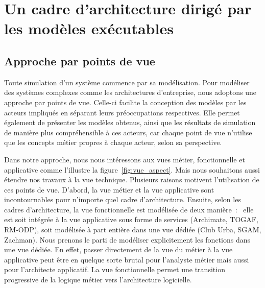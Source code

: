 \section{Un cadre d'architecture dirigé par les modèles exécutables}

\subsection{Approche par points de vue}

Toute simulation d'un système commence par sa modélisation. Pour modéliser des 
systèmes complexes comme les architectures d'entreprise, nous adoptons une 
approche par points de vue. Celle-ci facilite la conception des modèles par les 
acteurs impliqués en séparant leurs préoccupations respectives. Elle permet 
également de présenter les modèles obtenus, ainsi que les résultats de 
simulation de manière plus compréhensible à ces acteurs, car chaque point de vue 
n'utilise que les concepts métier propres à chaque acteur, selon sa perspective. 

Dans notre approche, nous nous intéressons aux vues métier, fonctionnelle et 
applicative comme l'illustre la figure~\ref{fig:vue_aspect}. Mais nous 
souhaitons aussi étendre nos travaux à la vue technique. 
Plusieurs raisons motivent l'utilisation de ces points de vue. D'abord, la vue 
métier et la vue applicative sont incontournables pour n'importe quel cadre 
d'architecture. Ensuite, selon les cadres d'architecture, la vue fonctionnelle 
est modélisée de deux manière~:~ elle est soit intégrée à la vue applicative 
sous forme de services (Archimate, TOGAF, RM-ODP), soit modélisée à part entière 
dans une vue dédiée (Club Urba, SGAM, Zachman). Nous prenons le parti de 
modéliser explicitement les fonctions dans une vue dédiée. En effet, passer 
directement de la vue du métier à la vue applicative peut être en quelque sorte 
brutal pour l'analyste métier mais aussi pour l'architecte applicatif. La vue 
fonctionnelle permet une transition progressive de la logique métier vers 
l'architecture logicielle.

